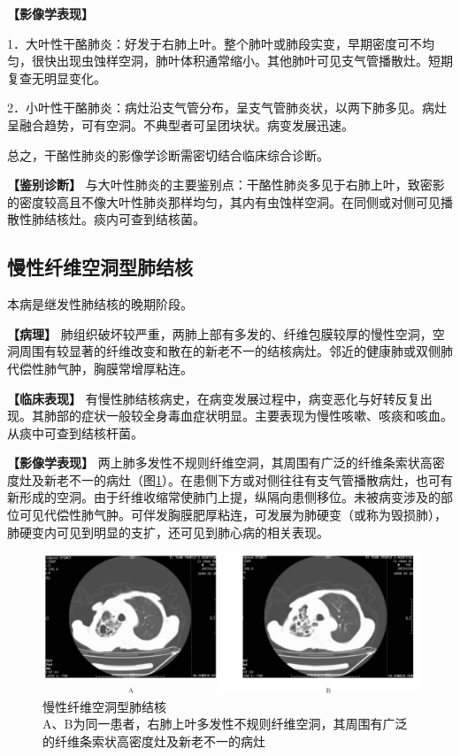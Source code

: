 \textbf{【影像学表现】}

1．大叶性干酪肺炎：好发于右肺上叶。整个肺叶或肺段实变，早期密度可不均匀，很快出现虫蚀样空洞，肺叶体积通常缩小。其他肺叶可见支气管播散灶。短期复查无明显变化。

2．小叶性干酪肺炎：病灶沿支气管分布，呈支气管肺炎状，以两下肺多见。病灶呈融合趋势，可有空洞。不典型者可呈团块状。病变发展迅速。

总之，干酪性肺炎的影像学诊断需密切结合临床综合诊断。

\textbf{【鉴别诊断】}
与大叶性肺炎的主要鉴别点：干酪性肺炎多见于右肺上叶，致密影的密度较高且不像大叶性肺炎那样均匀，其内有虫蚀样空洞。在同侧或对侧可见播散性肺结核灶。痰内可查到结核菌。

\subsection{慢性纤维空洞型肺结核}

本病是继发性肺结核的晚期阶段。

\textbf{【病理】}
肺组织破坏较严重，两肺上部有多发的、纤维包膜较厚的慢性空洞，空洞周围有较显著的纤维改变和散在的新老不一的结核病灶。邻近的健康肺或双侧肺代偿性肺气肿，胸膜常增厚粘连。

\textbf{【临床表现】}
有慢性肺结核病史，在病变发展过程中，病变恶化与好转反复出现。其肺部的症状一般较全身毒血症状明显。主要表现为慢性咳嗽、咳痰和咳血。从痰中可查到结核杆菌。

\textbf{【影像学表现】}
两上肺多发性不规则纤维空洞，其周围有广泛的纤维条索状高密度灶及新老不一的病灶（图\ref{fig9-25}）。在患侧下方或对侧往往有支气管播散病灶，也可有新形成的空洞。由于纤维收缩常使肺门上提，纵隔向患侧移位。未被病变涉及的部位可见代偿性肺气肿。可伴发胸膜肥厚粘连，可发展为肺硬变（或称为毁损肺），肺硬变内可见到明显的支扩，还可见到肺心病的相关表现。

\begin{figure}[!htbp]
 \centering
 \includegraphics[width=.7\textwidth,height=\textheight,keepaspectratio]{./images/Image00213.jpg}
 \captionsetup{justification=centering}
 \caption{慢性纤维空洞型肺结核\\{\small A、B为同一患者，右肺上叶多发性不规则纤维空洞，其周围有广泛的纤维条索状高密度灶及新老不一的病灶}}
 \label{fig9-25}
  \end{figure} 

